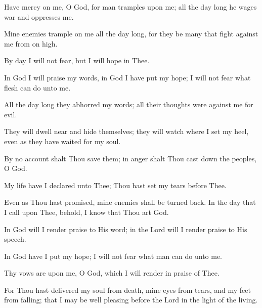 Have mercy on me, O God, for man tramples upon me; all the day long he wages war and oppresses me.

Mine enemies trample on me all the day long, for they be many that fight against me from on high.

By day I will not fear, but I will hope in Thee.

In God I will praise my words, in God I have put my hope; I will not fear what flesh can do unto me.

All the day long they abhorred my words; all their thoughts were against me for evil.

They will dwell near and hide themselves; they will watch where I set my heel, even as they have waited for my soul.

By no account shalt Thou save them; in anger shalt Thou cast down the peoples, O God.

My life have I declared unto Thee; Thou hast set my tears before Thee.

Even as Thou hast promised, mine enemies shall be turned back. In the day that I call upon Thee, behold, I know that Thou art God.

In God will I render praise to His word; in the Lord will I render praise to His speech.

In God have I put my hope; I will not fear what man can do unto me.

Thy vows are upon me, O God, which I will render in praise of Thee.

For Thou hast delivered my soul from death, mine eyes from tears, and my feet from falling; that I may be well pleasing before the Lord in the light of the living.
